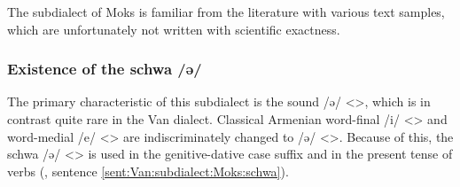 The subdialect of Moks is familiar from the literature with various text samples, which are unfortunately not written with scientific exactness. 


\begin{adjarianpage}\label{page:147}\end{adjarianpage}%

\subsubsection{Existence of the schwa /ə/}
The primary characteristic of this subdialect is the sound /ə/ <>, which is in contrast quite rare in the Van dialect. Classical Armenian word-final /i/ <> and word-medial /e/ <> are indiscriminately changed to /ə/ <>. Because of this, the schwa /ə/ <> is used in the genitive-dative case suffix and in the present tense of verbs (, sentence \ref{sent:Van:subdialect:Moks:schwa}).

\begin{table}[H]
	\centering
	\caption{Change from Classical Armenian /i, e/ <> to /ə/ <> in the Moks subdialect of the Van dialect}
	\label{tab:Van:subdialect:Moks:schwa}
\end{table} 

